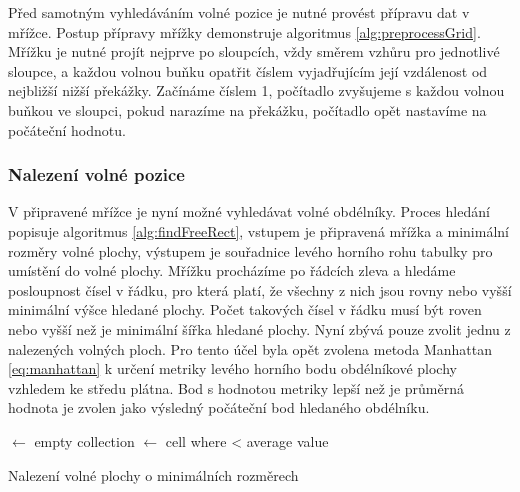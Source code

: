 \documentclass[czech,bachelor,public,dept460,male,oneside]{diploma}
\begin{document}
	Před samotným vyhledáváním volné pozice je nutné provést přípravu dat v mřížce. Postup přípravy mřížky demonstruje algoritmus \ref{alg:preprocessGrid}. Mřížku je nutné projít nejprve po sloupcích, vždy směrem vzhůru pro jednotlivé sloupce, a každou volnou buňku opatřit číslem vyjadřujícím její vzdálenost od nejbližší nižší překážky. Začínáme číslem 1, počítadlo zvyšujeme s každou volnou buňkou ve sloupci, pokud narazíme na překážku, počítadlo opět nastavíme na počáteční hodnotu. 
	
	\subsubsection{Nalezení volné pozice}
	V připravené mřížce je nyní možné vyhledávat volné obdélníky. Proces hledání popisuje algoritmus \ref{alg:findFreeRect}, vstupem je připravená mřížka a minimální rozměry volné plochy, výstupem je souřadnice levého horního rohu tabulky pro umístění do volné plochy. Mřížku procházíme po řádcích zleva a hledáme posloupnost čísel v řádku, pro která platí, že všechny z nich jsou rovny nebo vyšší minimální výšce hledané plochy. Počet takových čísel v řádku musí být roven nebo vyšší než je minimální šířka hledané plochy. Nyní zbývá pouze zvolit jednu z nalezených volných ploch. Pro tento účel byla opět zvolena metoda Manhattan \ref{eq:manhattan} k určení metriky levého horního bodu obdélníkové plochy vzhledem ke středu plátna. Bod s hodnotou metriky lepší než je průměrná hodnota je zvolen jako výsledný počáteční bod hledaného obdélníku. 
	
		\begin{algorithm}[!h]
		
		
		
		\BlankLine
		
		\Nodes $\leftarrow$ empty collection\;
		\Result $\leftarrow$ cell where  < average value\;
		\caption{Nalezení volné plochy o minimálních rozměrech}
		\label{alg:findFreeRect}
	\end{algorithm}
		
\end{document}
